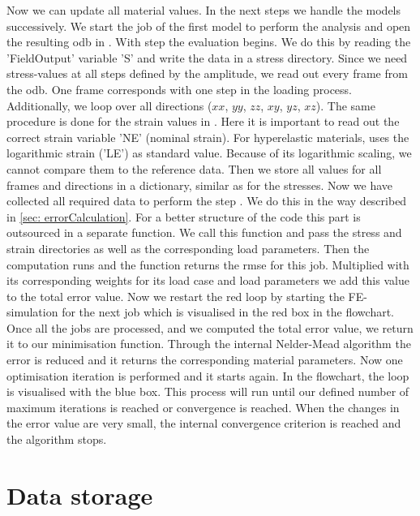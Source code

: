 Now we can update all material values. In the next steps we handle the models successively. We start the job of the first model to perform the  analysis and open the resulting \acrshort{odb} in . With step  the evaluation begins. We do this by reading the 'FieldOutput' variable 'S' and write the data in a stress directory. Since we need stress-values at all steps defined by the amplitude, we read out every frame from the \acrshort{odb}. One frame corresponds with one step in the loading process. Additionally, we loop over all directions ($xx$, $yy$, $zz$, $xy$, $yz$, $xz$). The same procedure is done for the strain values in . Here it is important to read out the correct strain variable 'NE' (nominal strain). For hyperelastic materials,  uses the logarithmic strain ('LE') as standard value. Because of its logarithmic scaling, we cannot compare them to the reference data. Then we store all values for all frames and directions in a dictionary, similar as for the stresses. Now we have collected all required data to perform the step . We do this in the way described in \autoref{sec: errorCalculation}. For a better structure of the code this part is outsourced in a separate function. We call this function and pass the stress and strain directories as well as the corresponding load parameters. Then the computation runs and the function returns the \acrshort{rmse} for this job. Multiplied with its corresponding weights for its load case and load parameters we add this value to the total error value. Now we restart the red loop by starting the FE-simulation for the next job which is visualised in the red box in the flowchart. Once all the jobs are processed, and we computed the total error value, we return it to our minimisation function. Through the internal Nelder-Mead algorithm the error is reduced and it returns the corresponding material parameters. Now one optimisation iteration is performed and it starts again. In the flowchart, the loop is visualised with the blue box. This process will run until our defined number of maximum iterations is reached or convergence is reached. When the changes in the error value are very small, the internal convergence criterion is reached and the algorithm stops.


\section{Data storage} \label{sec: dataStorage}

